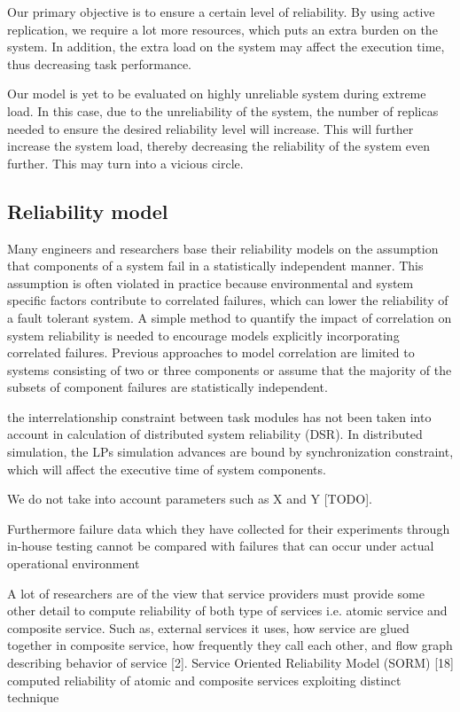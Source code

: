\documentclass{cslthse-msc}
\begin{document}
Our primary objective is to ensure a certain level of reliability. By using active replication, we require a lot more resources, which puts an extra burden on the system. In addition, the extra load on the system may affect the execution time, thus decreasing task performance.

Our model is yet to be evaluated on highly unreliable system during extreme load. In this case, due to the unreliability of the system, the number of replicas needed to ensure the desired reliability level will increase. This will further increase the system load, thereby decreasing the reliability of the system even further. This may turn into a vicious circle.

\subsection{Reliability model}
\label{sec:limitations_reliability_model}
Many engineers and researchers base their reliability models on the assumption that components of a system fail in a statistically independent manner. This assumption is often violated in practice because environmental and system specific factors contribute to correlated failures, which can lower the reliability of a fault tolerant system. A simple method to quantify the impact of correlation on system reliability is needed to encourage models explicitly incorporating correlated failures. Previous approaches to model correlation are limited to systems consisting of two or three components or assume that the majority of the subsets of component failures are statistically independent. \cite{discContRelModel}


the interrelationship constraint between task modules has not been taken into account in calculation of distributed system reliability (DSR). In distributed simulation, the LPs simulation advances are bound by synchronization constraint, which will affect the executive time of system components. \cite{relModelDistSimSystem}

We do not take into account parameters such as X and Y [TODO].

Furthermore failure data which they have collected for their experiments through in-house testing cannot be compared with failures that can occur under actual operational environment \cite{surveyReliabilityDistr}

A lot of researchers are of the view that service providers must provide some other detail to compute reliability of both type of services i.e. atomic service and composite service. Such as, external services it uses, how service are glued together in composite service, how frequently they call each other, and flow graph describing behavior of service [2]. Service Oriented Reliability Model (SORM) [18] computed reliability of atomic and composite services exploiting distinct technique \cite{surveyReliabilityDistr}
\end{document}
